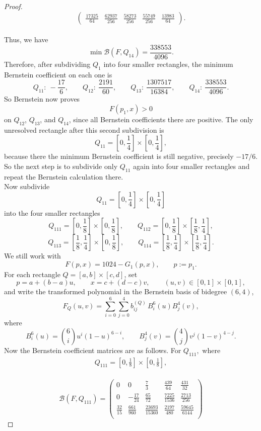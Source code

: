 \documentclass[a4paper,12pt,reqno]{amsart} %
\numberwithin{equation}{section}
\theoremstyle{definition}
\begin{document}
\begin{proof}
\[\begin{pmatrix}
	\frac{17325}{64} & \frac{62937}{256} & \frac{58273}{256} & \frac{55749}{256} & \frac{13983}{64}
\end{pmatrix}.
\]\\
Thus, we have 
\[
\min \mathcal B(F,Q_{14})=\frac{338553}{4096}.
\]
Therefore, after subdividing \(Q_1\) into four smaller rectangles, the minimum Bernstein coefficient on each one is
\[
Q_{11}:\ -\frac{17}{6},\qquad
Q_{12}:\ \frac{2191}{60},\qquad
Q_{13}:\ \frac{1307517}{16384},\qquad
Q_{14}:\ \frac{338553}{4096}.
\]
So Bernstein now proves
\[
F(p_1,x)>0
\]
on \(Q_{12}\), \(Q_{13}\), and \(Q_{14}\), since all Bernstein coefficients there are positive.
The only unresolved rectangle after this second subdivision is
\[
Q_{11}=\left[0,\frac14\right]\times\left[0,\frac14\right],
\]
because there the minimum Bernstein coefficient is still negative, precisely
$
-{17}/{6}.
$
So the next step is to subdivide only \(Q_{11}\) again into four smaller rectangles and repeat the Bernstein calculation there.\\[2mm]
Now subdivide
\[
Q_{11}=\left[0,\frac14\right]\times\left[0,\frac14\right]
\]
into the four smaller rectangles
\[
Q_{111}=\left[0,\frac18\right]\times\left[0,\frac18\right],\qquad
Q_{112}=\left[0,\frac18\right]\times\left[\frac18,\frac14\right],
\]
\[
Q_{113}=\left[\frac18,\frac14\right]\times\left[0,\frac18\right],\qquad
Q_{114}=\left[\frac18,\frac14\right]\times\left[\frac18,\frac14\right].
\]
We still work with
\[
F(p,x)=1024-G_1(p,x),\qquad p:=p_1.
\]
For each rectangle \(Q=[a,b]\times[c,d]\), set
\[
p=a+(b-a)u,\qquad x=c+(d-c)v,\qquad (u,v)\in[0,1]\times[0, 1],
\]
and write the transformed polynomial in the Bernstein basis of bidegree \((6,4)\),
\[
F_Q(u,v)=\sum_{i=0}^{6}\sum_{j=0}^{4} b_{ij}^{(Q)}\,B_i^6(u)B_j^4(v),
\]
where
\[
B_i^6(u)=\binom{6}{i}u^i(1-u)^{6-i},
\qquad
B_j^4(v)=\binom{4}{j}v^j(1-v)^{4-j}.
\]
Now the Bernstein coefficient matrices are as follows.
For $Q_{111},$ where
\begin{align*}
	Q_{111}=\left[0,\frac18\right]\times\left[0,\frac18\right],
\end{align*}\\
\[
\mathcal B(F,Q_{111})=
\begin{pmatrix}
	0 & 0 & \frac{7}{3} & \frac{439}{64} & \frac{431}{32}\\[5mm]
	0 & -\frac{17}{24} & \frac{65}{72} & \frac{7225}{1536} & \frac{2713}{256}\\[5mm]
	\frac{32}{15} & \frac{661}{960} & \frac{23693}{15360} & \frac{2197}{480} & \frac{59645}{6144}\\[5mm]

\end{pmatrix}\]
\end{proof}
\end{document}
